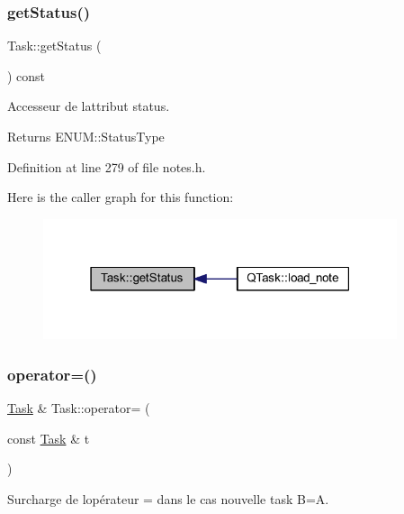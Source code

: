 \subsubsection{\texorpdfstring{get\+Status()}{getStatus()}}
{\footnotesize\ttfamily Task\+::get\+Status (\begin{DoxyParamCaption}{ }\end{DoxyParamCaption}) const\hspace{0.3cm}{\ttfamily [inline]}}



Accesseur de l\textquotesingle{}attribut status. 

\begin{DoxyReturn}{Returns}
E\+N\+U\+M\+::\+Status\+Type 
\end{DoxyReturn}


Definition at line 279 of file notes.\+h.

Here is the caller graph for this function\+:\nopagebreak
\begin{figure}[H]
\begin{center}
\leavevmode
\includegraphics[width=295pt]{class_task_a3eff8551f6ca6e268a2127388a097720_icgraph}
\end{center}
\end{figure}
\mbox{\label{class_task_a2430b942d050bf32c771821daa31493f}} 
\subsubsection{\texorpdfstring{operator=()}{operator=()}}
{\footnotesize\ttfamily \hyperlink{class_task}{Task} \& Task\+::operator= (\begin{DoxyParamCaption}\item[{const \hyperlink{class_task}{Task} \&}]{t }\end{DoxyParamCaption})}



Surcharge de l\textquotesingle{}opérateur = dans le cas nouvelle task B=A. 


